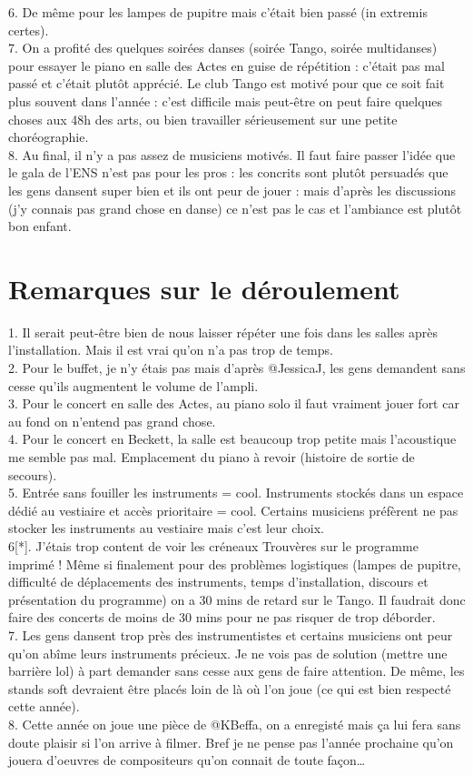 \documentclass[a4paper,11pt]{article}
\begin{document}
{6. De même pour les lampes de pupitre mais c'était bien passé (in extremis certes).\\
7. On a profité des quelques soirées danses (soirée Tango, soirée multidanses) pour essayer le piano en salle des Actes en guise de répétition : c'était pas mal passé et c'était plutôt apprécié. Le club Tango est motivé pour que ce soit fait plus souvent dans l'année : c'est difficile mais peut-être on peut faire quelques choses aux 48h des arts, ou bien travailler sérieusement sur une petite choréographie.\\
8. Au final, il n'y a pas assez de musiciens motivés. Il faut faire passer l'idée que le gala de l'ENS n'est pas pour les pros : les concrits sont plutôt persuadés que les gens dansent super bien et ils ont peur de jouer : mais d'après les discussions (j'y connais pas grand chose en danse) ce n'est pas le cas et l'ambiance est plutôt bon enfant.

\section{Remarques sur le déroulement}
1. Il serait peut-être bien de nous laisser répéter une fois dans les salles après l'installation. Mais il est vrai qu'on n'a pas trop de temps.\\
2. Pour le buffet, je n'y étais pas mais d'après @JessicaJ, les gens demandent sans cesse qu'ils augmentent le volume de l'ampli.\\
3. Pour le concert en salle des Actes, au piano solo il faut vraiment jouer fort car au fond on n'entend pas grand chose.\\
4. Pour le concert en Beckett, la salle est beaucoup trop petite mais l'acoustique me semble pas mal. Emplacement du piano à revoir (histoire de sortie de secours).\\
5. Entrée sans fouiller les instruments = cool. Instruments stockés dans un espace dédié au vestiaire et accès prioritaire = cool. Certains musiciens préfèrent ne pas stocker les instruments au vestiaire mais c'est leur choix.\\
6[*]. J'étais trop content de voir les créneaux Trouvères sur le programme imprimé ! Même si finalement pour des problèmes logistiques (lampes de pupitre, difficulté de déplacements des instruments, temps d'installation, discours et présentation du programme) on a 30 mins de retard sur le Tango. Il faudrait donc faire des concerts de moins de 30 mins pour ne pas risquer de trop déborder.\\
7. Les gens dansent trop près des instrumentistes et certains musiciens ont peur qu'on abîme leurs instruments précieux. Je ne vois pas de solution (mettre une barrière lol) à part demander sans cesse aux gens de faire attention. De même, les stands soft devraient être placés loin de là où l'on joue (ce qui est bien respecté cette année).\\
8. Cette année on joue une pièce de @KBeffa, on a enregisté mais ça lui fera sans doute plaisir si l'on arrive à filmer. Bref je ne pense pas l'année prochaine qu'on jouera d'oeuvres de compositeurs qu'on connait de toute façon\dots

}
\end{document}
